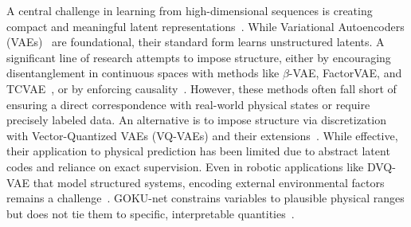 \documentclass[nonacm,sigconf]{acmart}
\begin{document}

 
A central challenge in learning from high-dimensional sequences is creating compact and meaningful latent representations~\cite[]{shi2015convolutional,bai2018empirical}. While Variational Autoencoders (VAEs)~\cite[]{kingma2013auto} are foundational, their standard form learns unstructured latents. A significant line of research attempts to impose structure, either by encouraging disentanglement in continuous spaces with methods like \(\beta\)-VAE, FactorVAE, and TCVAE~\cite[]{higgins2017beta, kim2018disentangling, chen2018isolating}, or by enforcing causality~\cite[]{yang2021causalvae}. However, these methods often fall short of ensuring a direct correspondence with real-world physical states or require precisely labeled data. An alternative is to impose structure via discretization with Vector-Quantized VAEs (VQ-VAEs) and their extensions~\cite[]{van2017neural, razavi2019generating, xue2019supervised}. While effective, their application to physical prediction has been limited due to abstract latent codes and reliance on exact supervision. Even in robotic applications like DVQ-VAE that model structured systems, encoding external environmental factors remains a challenge~\cite[]{zhao2024decomposed}. GOKU-net constrains variables to plausible physical ranges but does not tie them to specific, interpretable quantities~\cite[]{linial_generative_2021}.
\end{document}
